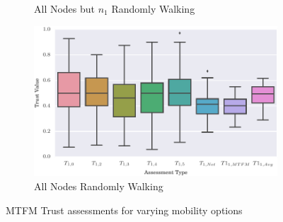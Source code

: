 \documentclass[runningheads,a4paper]{llncs}
\begin{document}
{{\begin{figure}
\begin{subfigure}{.5\textwidth}
  \caption{All Nodes but $n_1$ Randomly Walking}
  \label{fig:trust_allbut1}
\end{subfigure}
\begin{subfigure}{.5\textwidth}
\centering
  \includegraphics[width=.8\linewidth]{img/trust_bella_all_mobile.pdf}
  \caption{All Nodes Randomly Walking}
  \label{fig:trust_all_mobile}
\end{subfigure}
\caption{MTFM Trust assessments for varying mobility options}
\label{fig:trust_mobility}
\end{figure}

}}
\end{document}
